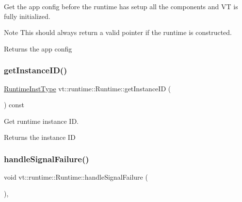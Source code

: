 Get the app config before the runtime has setup all the components and VT is fully initialized. 

\begin{DoxyNote}{Note}
This should always return a valid pointer if the runtime is constructed.
\end{DoxyNote}
\begin{DoxyReturn}{Returns}
the app config 
\end{DoxyReturn}
\mbox{\label{structvt_1_1runtime_1_1_runtime_a06400b91b766f83d4b630bdc9ed840b1}} 
\subsubsection{\texorpdfstring{get\+Instance\+I\+D()}{getInstanceID()}}
{\footnotesize\ttfamily \hyperlink{namespacevt_1_1runtime_afca910c1b38b3975f7c1da8001a77d58}{Runtime\+Inst\+Type} vt\+::runtime\+::\+Runtime\+::get\+Instance\+ID (\begin{DoxyParamCaption}{ }\end{DoxyParamCaption}) const\hspace{0.3cm}{\ttfamily [inline]}}



Get runtime instance ID. 

\begin{DoxyReturn}{Returns}
the instance ID 
\end{DoxyReturn}
\mbox{\label{structvt_1_1runtime_1_1_runtime_a0ac4eb5f200bc06c59868ec58dee508d}} 
\subsubsection{\texorpdfstring{handle\+Signal\+Failure()}{handleSignalFailure()}}
{\footnotesize\ttfamily void vt\+::runtime\+::\+Runtime\+::handle\+Signal\+Failure (\begin{DoxyParamCaption}{ }\end{DoxyParamCaption})\hspace{0.3cm}{\ttfamily [static]}, {\ttfamily [private]}}




